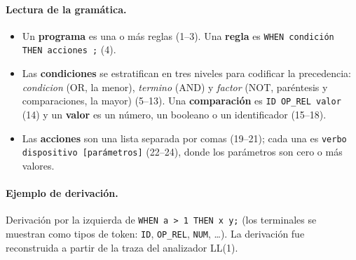 \paragraph{Lectura de la gramática.}
\begin{itemize}[nosep]
\item Un \textbf{programa} es una o más reglas (1--3). Una \textbf{regla} es \texttt{WHEN condición THEN acciones ;} (4).
\item Las \textbf{condiciones} se estratifican en tres niveles para codificar la precedencia: \textit{condicion} (OR, la menor),
\textit{termino} (AND) y \textit{factor} (NOT, paréntesis y comparaciones, la mayor) (5--13). Una \textbf{comparación} es
\texttt{ID OP\_REL valor} (14) y un \textbf{valor} es un número, un booleano o un identificador (15--18).
\item Las \textbf{acciones} son una lista separada por comas (19--21); cada una es \texttt{verbo dispositivo [parámetros]} (22--24), donde los
parámetros son cero o más valores.
\end{itemize}

\paragraph{Ejemplo de derivación.} Derivación por la izquierda de \texttt{WHEN a > 1 THEN x y;} (los terminales se muestran como
tipos de token: \texttt{ID}, \texttt{OP\_REL}, \texttt{NUM}, \dots). La derivación fue reconstruida a partir de la traza del analizador LL(1).

